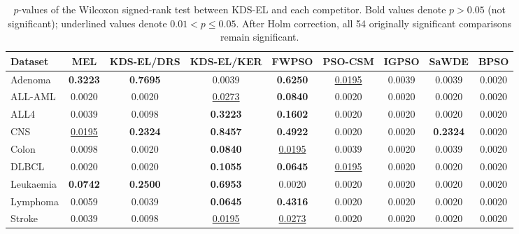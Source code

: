 \documentclass[a4paper,fleqn]{cas-dc}
\begin{document}
\begin{sloppypar}
\begin{table}[t]
\centering
\caption{$p$-values of the Wilcoxon signed-rank test between KDS-EL and each competitor.
Bold values denote $p>0.05$ (not significant); underlined values denote $0.01<p\leq0.05$.
After Holm correction, all 54 originally significant comparisons remain significant.}
\label{tab:wilcoxon}
\setlength{\tabcolsep}{4pt}
\begin{tabular}{lcccccccc}
\toprule
\textbf{Dataset} & \textbf{MEL} & \textbf{KDS-EL/DRS} & \textbf{KDS-EL/KER} & \textbf{FWPSO} & \textbf{PSO-CSM} & \textbf{IGPSO} & \textbf{SaWDE} & \textbf{BPSO} \\
\midrule
Adenoma & \textbf{0.3223} & \textbf{0.7695} & 0.0039 & \textbf{0.6250} & \underline{0.0195} & 0.0039 & 0.0039 & 0.0020 \\
ALL-AML & 0.0020 & 0.0020 & \underline{0.0273} & \textbf{0.0840} & 0.0020 & 0.0020 & 0.0020 & 0.0020 \\
ALL4 & 0.0039 & 0.0098 & \textbf{0.3223} & \textbf{0.1602} & 0.0020 & 0.0020 & 0.0020 & 0.0020 \\
CNS & \underline{0.0195} & \textbf{0.2324} & \textbf{0.8457} & \textbf{0.4922} & 0.0020 & 0.0020 & \textbf{0.2324} & 0.0020 \\
Colon & 0.0098 & 0.0020 & \textbf{0.0840} & \underline{0.0195} & 0.0039 & 0.0020 & 0.0039 & 0.0020 \\
DLBCL & 0.0020 & 0.0020 & \textbf{0.1055} & \textbf{0.0645} & \underline{0.0195} & 0.0020 & 0.0020 & 0.0020 \\
Leukaemia & \textbf{0.0742} & \textbf{0.2500} & \textbf{0.6953} & 0.0020 & 0.0020 & 0.0020 & 0.0020 & 0.0020 \\
Lymphoma & 0.0059 & 0.0039 & \textbf{0.0645} & \textbf{0.4316} & 0.0020 & 0.0020 & 0.0020 & 0.0020 \\
Stroke & 0.0039 & 0.0098 & \underline{0.0195} & \underline{0.0273} & 0.0020 & 0.0020 & 0.0020 & 0.0020 \\
\bottomrule
\end{tabular}
\end{table}


\end{sloppypar}
\end{document}
